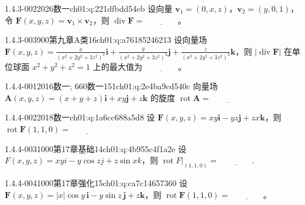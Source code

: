\begin{q}{1.4.3-002}{2026数一}{ch01:q:221dfbdd54eb}
设向量 $\boldsymbol{v}_1=(0,x,z)$，$\boldsymbol{v}_2=(y,0,1)$，令 $\boldsymbol{F}(x,y,z)=\boldsymbol{v}_1\times \boldsymbol{v}_2$，则 $\operatorname{div}\boldsymbol{F}=\underline{\hspace{4em}}$。
\end{q}

\begin{q}{1.4.3-003}{900第九章A类16}{ch01:q:a76185246213}
设向量场 $\boldsymbol{F}(x,y,z)=\frac{x}{(x^2+2y^2+3z^2)^2}\boldsymbol{i}+\frac{y}{(x^2+2y^2+3z^2)^2}\boldsymbol{j}+\frac{z}{(x^2+2y^2+3z^2)^2}\boldsymbol{k}$，则 $|\operatorname{div}\boldsymbol{F}|$ 在单位球面 $x^2+y^2+z^2=1$ 上的最大值为 $\underline{\hspace{4em}}$。
\end{q}

\par\addvspace{2.4ex}\noindent
\begin{minipage}{\linewidth}

\begin{q}{1.4.4-001}{2016数一; 660数一151}{ch01:q:2e4ba9cd540c}
向量场 $\mathbf{A}(x,y,z)=(x+y+z)\mathbf{i}+xy\mathbf{j}+z\mathbf{k}$ 的旋度 $\operatorname{rot}\mathbf{A}=\underline{\hspace{4em}}$
\end{q}
\end{minipage}


\begin{q}{1.4.4-002}{2018数一}{ch01:q:1a6cc688a5d8}
设 $\mathbf{F}(x,y,z)=xy\mathbf{i}-yz\mathbf{j}+zx\mathbf{k}$，则 $\operatorname{rot}\mathbf{F}(1,1,0)=\underline{\hspace{4em}}$
\end{q}

\begin{q}{1.4.4-003}{1000第17章基础14}{ch01:q:4b955c4f1a2e}
设 $F(x,y,z)=xyi-y\cos zj+z\sin xk$，则 $\operatorname{rot}F\big|_{(1,1,0)}=\underline{\hspace{4em}}$.
\end{q}

\begin{q}{1.4.4-004}{1000第17章强化15}{ch01:q:ca7c14657360}
设 $ \boldsymbol{F}(x,y,z)=|x|\cos y\,\boldsymbol{i}-y\sin z\,\boldsymbol{j}+z\boldsymbol{k} $，则 $ \operatorname{rot}\boldsymbol{F}(1,1,0)=\underline{\hspace{4em}} $。
\end{q}

